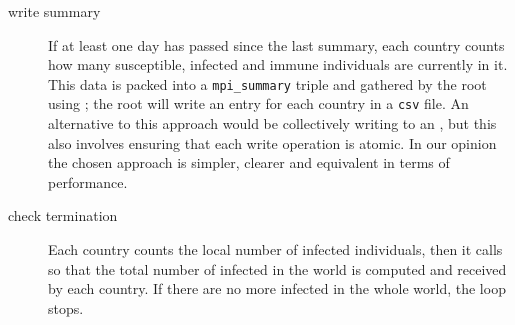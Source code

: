 \begin{description}
    \item[write summary] If at least one day has passed since the last summary, each country counts how many susceptible, infected and immune individuals are currently in it. This data is packed into a \texttt{mpi\_summary} triple and gathered by the root using \MPIGather; the root will write an entry for each country in a \texttt{csv} file. An alternative to this approach would be collectively writing to an \MPIFile , but this also involves ensuring that each write operation is atomic. In our opinion the chosen approach is simpler, clearer and equivalent in terms of performance.
     
    \item[check termination] Each country counts the local number of infected individuals, then it calls \MPIAllreduce so that the total number of infected in the world is computed and received by each country. If there are no more infected in the whole world, the loop stops.
\end{description}


